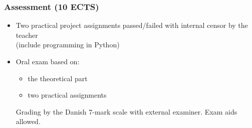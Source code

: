 \documentclass[smaller,aspectratio=169,ignorenonframetext,compress,sans,fleqn,xcolor=dvipsnames,fleqn,table,stillsansserifmath,stillsansseriftext,stillsansserifsmall,stillsansseriflarge]{beamer}
\begin{document}
\begin{frame}%
  \frametitle{Assessment (10 ECTS)}


\medskip

\begin{itemize}

\itemsep=3ex

\item  Two practical project assignments passed/failed with internal censor by
  the teacher\\
  (include programming in Python)

\item Oral exam based on:
  \begin{itemize}

  \item the theoretical part
  \item two practical assignments
  \end{itemize}
Grading by the Danish 7-mark
scale with external examiner. Exam aids allowed.
\end{itemize}

\end{frame}




\end{document}
